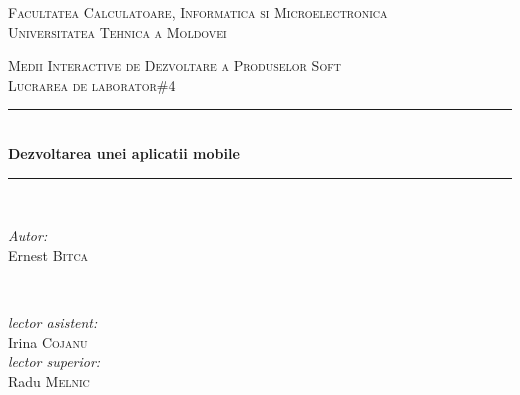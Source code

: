 \begin{titlepage}

\begin{center} %

\textsc{\large Facultatea Calculatoare, Informatica si Microelectronica}\\[0.5cm]
\textsc{\large Universitatea Tehnica a Moldovei}\\[1.2cm] %
\vspace{25 mm}

\textsc{\Large Medii Interactive de Dezvoltare a Produselor Soft}\\[0.5cm] %
\textsc{\large Lucrarea de laborator\#4}\\[0.5cm] %

\newcommand{\HRule}{\rule{\linewidth}{0.5mm}} %

\vspace{10 mm}
\HRule \\[0.4cm]
{ \LARGE \bfseries Dezvoltarea unei aplicatii mobile}\\[0.4cm] %
\HRule \\[1.5cm]

\vspace{30mm}

\begin{minipage}{0.4\textwidth}
\begin{flushleft} \large
\emph{Autor:}\\
		Ernest \textsc{Bitca}
		\end{flushleft}
		\end{minipage}
		~
		\begin{minipage}{0.4\textwidth}
		\begin{flushright} \large
		\emph{lector asistent:} \\
			Irina \textsc{Cojanu} \\ %
			\emph{lector superior:} \\
				Radu \textsc{Melnic} %
				\end{flushright}
				\end{minipage}\\[4cm]


\end{center}
\end{titlepage}
